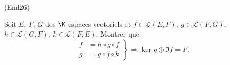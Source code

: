 \begin{tiny}(Eml26)\end{tiny} Soit $E$, $F$, $G$ des $\K$-espaces vectoriels et $f\in \mathcal{L}(E,F)$, $g\in \mathcal{L}(F,G)$, $h\in \mathcal{L}(G,F)$, $k\in \mathcal{L}(F,E)$. Montrer que
\[
 \left. 
 \begin{aligned}
  f &= h \circ g \circ f \\ 
  g &= g \circ f \circ k
 \end{aligned}
\right\rbrace 
\Rightarrow \ker g \oplus \Im f = F.
\]
